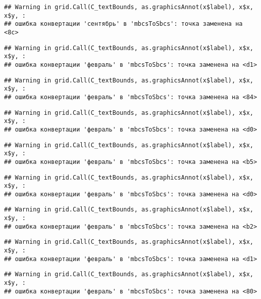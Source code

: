 \documentclass[
]{article}
\begin{document}
\begin{verbatim}
## Warning in grid.Call(C_textBounds, as.graphicsAnnot(x$label), x$x, x$y, :
## ошибка конвертации 'сентябрь' в 'mbcsToSbcs': точка заменена на <8c>
\end{verbatim}

\begin{verbatim}
## Warning in grid.Call(C_textBounds, as.graphicsAnnot(x$label), x$x, x$y, :
## ошибка конвертации 'февраль' в 'mbcsToSbcs': точка заменена на <d1>
\end{verbatim}

\begin{verbatim}
## Warning in grid.Call(C_textBounds, as.graphicsAnnot(x$label), x$x, x$y, :
## ошибка конвертации 'февраль' в 'mbcsToSbcs': точка заменена на <84>
\end{verbatim}

\begin{verbatim}
## Warning in grid.Call(C_textBounds, as.graphicsAnnot(x$label), x$x, x$y, :
## ошибка конвертации 'февраль' в 'mbcsToSbcs': точка заменена на <d0>
\end{verbatim}

\begin{verbatim}
## Warning in grid.Call(C_textBounds, as.graphicsAnnot(x$label), x$x, x$y, :
## ошибка конвертации 'февраль' в 'mbcsToSbcs': точка заменена на <b5>
\end{verbatim}

\begin{verbatim}
## Warning in grid.Call(C_textBounds, as.graphicsAnnot(x$label), x$x, x$y, :
## ошибка конвертации 'февраль' в 'mbcsToSbcs': точка заменена на <d0>
\end{verbatim}

\begin{verbatim}
## Warning in grid.Call(C_textBounds, as.graphicsAnnot(x$label), x$x, x$y, :
## ошибка конвертации 'февраль' в 'mbcsToSbcs': точка заменена на <b2>
\end{verbatim}

\begin{verbatim}
## Warning in grid.Call(C_textBounds, as.graphicsAnnot(x$label), x$x, x$y, :
## ошибка конвертации 'февраль' в 'mbcsToSbcs': точка заменена на <d1>
\end{verbatim}

\begin{verbatim}
## Warning in grid.Call(C_textBounds, as.graphicsAnnot(x$label), x$x, x$y, :
## ошибка конвертации 'февраль' в 'mbcsToSbcs': точка заменена на <80>
\end{verbatim}
\end{document}
